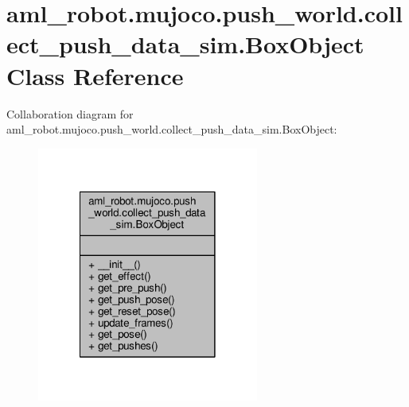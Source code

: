 \hypertarget{classaml__robot_1_1mujoco_1_1push__world_1_1collect__push__data__sim_1_1_box_object}{\section{aml\-\_\-robot.\-mujoco.\-push\-\_\-world.\-collect\-\_\-push\-\_\-data\-\_\-sim.\-Box\-Object Class Reference}
\label{classaml__robot_1_1mujoco_1_1push__world_1_1collect__push__data__sim_1_1_box_object}
}


Collaboration diagram for aml\-\_\-robot.\-mujoco.\-push\-\_\-world.\-collect\-\_\-push\-\_\-data\-\_\-sim.\-Box\-Object\-:
\nopagebreak
\begin{figure}[H]
\begin{center}
\leavevmode
\includegraphics[width=206pt]{classaml__robot_1_1mujoco_1_1push__world_1_1collect__push__data__sim_1_1_box_object__coll__graph}
\end{center}
\end{figure}
